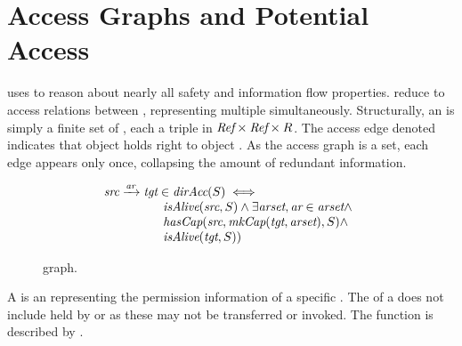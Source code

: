 \section{Access Graphs and Potential Access}

\TMmodelName{} uses \term{\TMaccessGraphs} to reason about nearly all safety and information flow properties.
\xmakefirstuc{\TMaccessGraphs} reduce \TMsystemStates{} to access relations between \TMobjs{}, representing multiple \TMsystemStates{} simultaneously.
Structurally, an \term{\TMaccessGraph} is simply a finite set of \TMaccessEdges{}, each a triple in \(\textit{Ref}{} \times \textit{Ref}{} \times R{}\).
The access edge denoted  indicates that object  holds right  to object .
As the access graph is a set, each edge appears only once, collapsing the amount of redundant information.

\begin{figure}
  \[
  \begin{array}{l}
    \mkEdge{\ident{src}}{\ident{tgt}}{\ident{ar}} \in \FNdirAcc{S} \iff \\
    \makebox[15 mm][l]{}
    \begin{array}{l}
      \FNisAlive{\ident{src}}{S} \wedge
      \exists \ident{arset}, \ident{ar} \in \ident{arset} \wedge \\
      \FNhasCap{\ident{src}}{\FNmkCap{\ident{tgt}}{\ident{arset}}}{S} \wedge \\
      \FNisAlive{\ident{tgt}}{S})
    \end{array}
  \end{array}
\]
\caption{\xmakefirstuc{\TMdirAcc} graph. \label{fig:sketch:dirAcc}}
\end{figure}

A \term{\TMdirAccAG} is an \TMaccessGraph{} representing the permission information of a specific \TMsystemState{}.
The \TMdirAccAG{} of a \TMsystemState{} does not include \TMcaps{} held by \TMunborn{} or \TMdead{} \TMobjs{} as these \TMcaps{} may not be transferred or invoked.
The \TMdirAccAG{} function \NMdirAcc{} is described by .

